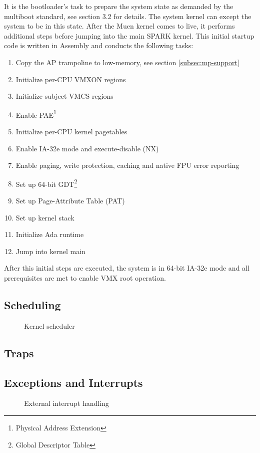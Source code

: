 It is the bootloader's task to prepare the system state as demanded by the
multiboot standard, see \cite{multiboot} section 3.2 for details. The system
kernel can except the system to be in this state. After the Muen kernel comes to
live, it performs additional steps before jumping into the main SPARK kernel.
This initial startup code is written in Assembly and conducts the following
tasks:
\begin{enumerate}
	\item Copy the AP trampoline to low-memory, see section
		\ref{subsec:mp-support} \item Initialize per-CPU VMXON regions
	\item Initialize subject VMCS regions
	\item Enable PAE\footnote{Physical Address Extension}
	\item Initialize per-CPU kernel pagetables
	\item Enable IA-32e mode and execute-disable (NX)
	\item Enable paging, write protection, caching and native FPU error
		reporting
	\item Set up 64-bit GDT\footnote{Global Descriptor Table}
	\item Set up Page-Attribute Table (PAT)
	\item Set up kernel stack
	\item Initialize Ada runtime
	\item Jump into kernel main
\end{enumerate}
After this initial steps are executed, the system is in 64-bit IA-32e mode and
all prerequisites are met to enable VMX root operation.

\subsection{Scheduling}
\begin{figure}[h]
	\centering
	
	\caption{Kernel scheduler}
	\label{fig:kernel-scheduler}
\end{figure}

\subsection{Traps}\label{subsec:traps}
\subsection{Exceptions and Interrupts}\label{subsec:excp-and-ints}
\begin{figure}[h]
	\centering
	
	\caption{External interrupt handling}
	\label{fig:external-interrupt}
\end{figure}


